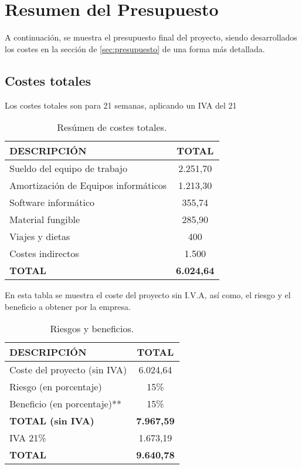 \section{Resumen del Presupuesto}
\par A continuación, se muestra el presupuesto final del proyecto, siendo desarrollados los costes en la sección de \ref{sec:presupuesto} de una forma más detallada.
\subsection{Costes totales}
\par Los costes totales son para 21 semanas, aplicando un IVA del 21%
\begin{table}[H]
\begin{center}
\begin{tabular}{l c}
\textbf{DESCRIPCIÓN} & \textbf{TOTAL}\\ \hline \hline
Sueldo del equipo de trabajo & 2.251,70\\
Amortización de Equipos informáticos & 1.213,30\\
Software informático & 355,74\\
Material fungible & 285,90\\
Viajes y dietas & 400\\
Costes indirectos & 1.500\\ \hline \hline
\textbf{TOTAL} & \textbf{6.024,64}\\ \hline
\end{tabular}
\caption{Resúmen de costes totales.}
\label{tab:resumenTotal}
\end{center}
\end{table}

En esta tabla se muestra el coste del proyecto sin I.V.A, así como, el riesgo y el beneficio a obtener por la empresa.
\begin{table}[H]
\begin{center}
\begin{tabular}{l c}
\textbf{DESCRIPCIÓN} & \textbf{TOTAL}\\ \hline \hline
Coste del proyecto (sin IVA) &  6.024,64\\
Riesgo (en porcentaje) & 15\% \\
Beneficio (en porcentaje)** & 15\% \\ \hline \hline
\textbf{TOTAL (sin IVA)} & \textbf{7.967,59}\\ \hline \hline
IVA 21\% & 1.673,19 \\\hline \hline
\textbf{TOTAL} &  \textbf{9.640,78}\\ \hline
\end{tabular}
\caption{Riesgos y beneficios.}
\label{tab:total}
\end{center}
\end{table}
